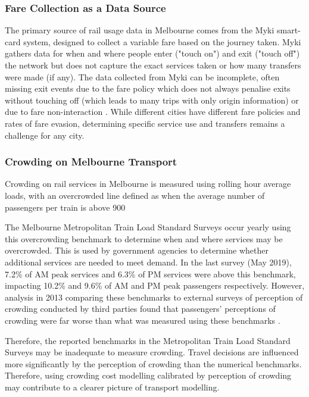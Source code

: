 \subsubsection{Fare Collection as a Data Source}
The primary source of rail usage data in Melbourne comes from the Myki smart-card system, designed to collect a variable fare based on the journey taken. Myki gathers data for when and where people enter ("touch on") and exit ("touch off") the network but does not capture the exact services taken or how many transfers were made (if any). The data collected from Myki can be incomplete, often missing exit events due to the fare policy which does not always penalise exits without touching off (which leads to many trips with only origin information) or due to fare non-interaction \cite{yinInvestigationPublicTransport2022}. While different cities have different fare policies and rates of fare evasion, determining specific service use and transfers remains a challenge for any city. 

\subsubsection{Crowding on Melbourne Transport}
Crowding on rail services in Melbourne is measured using rolling hour average loads, with an overcrowded line defined as when the average number of passengers per train is above 900 \cite{liCrowdingPublicTransport2013}

The Melbourne Metropolitan Train Load Standard Surveys occur yearly using this overcrowding benchmark to determine when and where services may be overcrowded. This is used by government agencies to determine whether additional services are needed to meet demand. In the last survey (May 2019), 7.2\% of AM peak services and 6.3\% of PM services were above this benchmark, impacting 10.2\% and 9.6\% of AM and PM peak passengers respectively. However, analysis in 2013 comparing these benchmarks to external surveys of perception of crowding conducted by third parties found that passengers' perceptions of crowding were far worse than what was measured using these benchmarks \cite{liCrowdingPublicTransport2013}. 

Therefore, the reported benchmarks in the Metropolitan Train Load Standard Surveys may be inadequate to measure crowding. Travel decisions are influenced more significantly by the perception of crowding than the numerical benchmarks. Therefore, using crowding cost modelling calibrated by perception of crowding may contribute to a clearer picture of transport modelling. 

